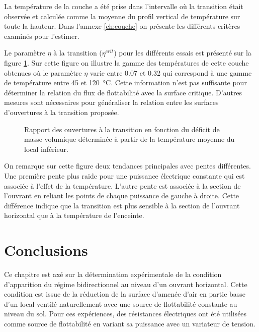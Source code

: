 La température de la couche a été prise dans l'intervalle où la transition était observée et calculée comme la moyenne du profil vertical de température sur toute la hauteur. Dans l'annexe \ref{ch:couche} on présente les différents critères examinés pour l'estimer.

Le paramètre $\eta$ à la transition ($\eta^{crit}$) pour les différents essais est présenté sur la figure \ref{fig:eta_ab_at_visu}. Sur cette figure on illustre la gamme des températures de cette couche obtenues où le paramètre $\eta$ varie entre 0.07 et 0.32 qui correspond à une gamme de température entre 45 et \SI{120}{\celsius}. Cette information n'est pas suffisante pour déterminer la relation du flux de flottabilité avec la surface critique. D'autres mesures sont nécessaires pour généraliser la relation entre les surfaces d'ouvertures à la transition proposée.

\begin{figure}
\centering
\resizebox{0.67\textwidth}{!}{}
\caption{Rapport des ouvertures à la transition en fonction du déficit de masse volumique déterminée à partir de la température moyenne du local inférieur.}
\label{fig:eta_ab_at_visu}
\end{figure}

On remarque sur cette figure deux tendances principales avec pentes différentes. Une première pente plus raide pour une puissance électrique constante qui est associée à l'effet de la température. L'autre pente est associée à la section de l'ouvrant en reliant les points de chaque puissance de gauche à droite. Cette différence indique que la transition est plus sensible à la section de l'ouvrant horizontal que à la température de l'enceinte.

\section{Conclusions}

Ce chapitre est axé sur la détermination expérimentale de la condition d'apparition du régime bidirectionnel au niveau d'un ouvrant horizontal. Cette condition est issue de la réduction de la surface d'amenée d'air en partie basse d'un local ventilé naturellement avec une source de flottabilité constante au niveau du sol. Pour ces expériences, des résistances électriques ont été utilisées comme source de flottabilité en variant sa puissance avec un variateur de tension.

